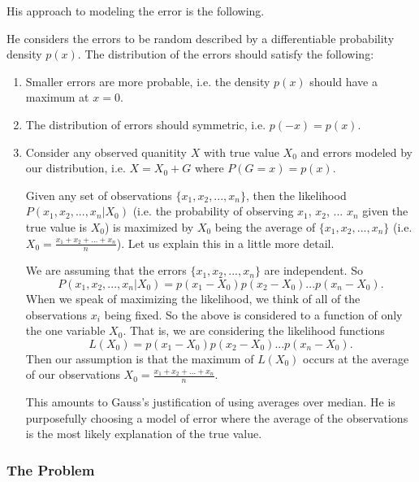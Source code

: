 His approach to modeling the error is the following.

He considers the errors to be random described by a differentiable probability density \(p(x)\). The distribution of the errors should satisfy the following:

\begin{enumerate}
\item Smaller errors are more probable, i.e. the density \(p(x)\) should have a maximum at \(x = 0\).
\item The distribution of errors should symmetric, i.e. \(p(-x) = p(x)\).
\item Consider any observed quanitity \(X\) with true value \(X_0\) and errors modeled by our distribution, i.e. \(X = X_0 + G\) where \(P(G = x) = p(x)\). 

Given any set of observations \(\{x_1, x_2, ..., x_n\}\), then the likelihood \(P(x_1, x_2, ..., x_n | X_0)\) 
(i.e. the probability of observing \(x_1\), \(x_2\), ... \(x_n\) given the true value is \(X_0\)) is maximized by \(X_0\) being the average of \(\{x_1, x_2, ..., x_n\}\)
(i.e. \(X_0 = \frac{x_1 + x_2 +... + x_n}{n}\)). Let us explain this in a little more detail.

We are assuming that the errors \(\{x_1, x_2, ..., x_n\}\) are independent. So
\begin{equation}
P(x_1, x_2, ..., x_n | X_0) = p(x_1 - X_0)p(x_2 - X_0)...p(x_n - X_0).
\end{equation}
When we speak of maximizing the likelihood, we think of all of the observations \(x_i\) being fixed. So the above is considered to a function of only the one variable \(X_0\). That is,
we are considering the likelihood functions
\begin{equation}
L(X_0) = p(x_1 - X_0)p(x_2 - X_0)...p(x_n - X_0).
\end{equation}
Then our assumption is that the maximum of \(L(X_0)\) occurs at the average of our observations \(X_0 = \frac{x_1 + x_2 + ... + x_n}{n}\).

This amounts to Gauss's justification of using averages over median. He is purposefully choosing a model of error where the average of the observations is the most likely explanation of
the true value.

\end{enumerate}

\subsubsection*{The Problem}

